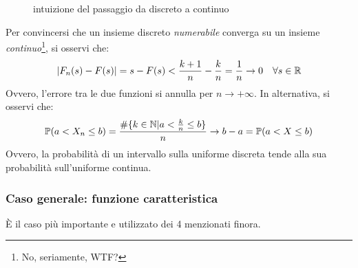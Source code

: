 \begin{ese}
\begin{figure}[H]

    \caption{intuizione del passaggio da discreto a continuo}\label{fig-intuizione-discreto-continuo}
  \end{figure}

  Per convincersi che un insieme discreto \emph{numerabile} converga su un insieme \emph{continuo}\footnote{No, seriamente, WTF?}, si osservi che:
  $$|F_n(s) - F(s)| = s - F(s) < \frac{k+1} n - \frac k n = \frac 1 n \to 0 \quad \forall s \in \mathbb R$$
  Ovvero, l'errore tra le due funzioni si annulla per $n \to +\infty$.
  In alternativa, si osservi che:
  $$ \mathbb P(a < X_n \leq b) = \frac{\#\{ k \in \mathbb N | a < \frac k n \leq b \}}n \to b-a = \mathbb P(a < X \leq b)$$
  Ovvero, la probabilità di un intervallo sulla uniforme discreta tende alla sua probabilità sull'uniforme continua.
\end{ese}

\subsubsection{Caso generale: funzione caratteristica}
È il caso più importante e utilizzato dei 4 menzionati finora.

